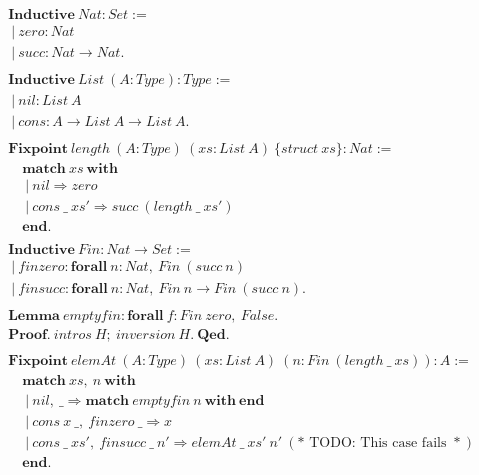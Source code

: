 \begin{align*}
&\mathbf{Inductive}\ Nat : Set :=\\
&\ |\ zero : Nat\\
&\ |\ succ : Nat \rightarrow Nat.\\
\\
&\mathbf{Inductive}\ List\ (A : Type) : Type :=\\
&\ |\ nil : List\ A\\
&\ |\ cons : A \rightarrow List\ A \rightarrow List\ A.\\
\\
&\mathbf{Fixpoint}\ length\ (A : Type)\ (xs : List\ A)\ \{struct\ xs\} : Nat :=\\
&\quad\mathbf{match}\ xs\ \mathbf{with}\\
&\quad\ |\ nil \Rightarrow zero\\
&\quad\ |\ cons\ \_\ xs' \Rightarrow succ\ (length\ \_\ xs')\\
&\quad\mathbf{end}.\\
\\
&\mathbf{Inductive}\ Fin : Nat \rightarrow Set :=\\
&\ |\ finzero : \mathbf{forall}\ n : Nat,\ Fin\ (succ\ n)\\
&\ |\ finsucc : \mathbf{forall}\ n : Nat,\ Fin\ n \rightarrow Fin\ (succ\ n).\\
\\
&\mathbf{Lemma}\ emptyfin : \mathbf{forall}\ f : Fin\ zero,\ False.\\
&\mathbf{Proof}.\ intros\ H;\ inversion\ H.\ \mathbf{Qed}.\\
\\
&\mathbf{Fixpoint}\ elemAt\ (A : Type)\ (xs : List\ A)\ (n : Fin\ (length\ \_\ xs)) : A :=\\
&\quad\mathbf{match}\ xs,\ n\ \mathbf{with}\\
&\quad\ |\ nil,\ \_ \Rightarrow \mathbf{match}\ emptyfin\ n\ \mathbf{with\ end}\\
&\quad\ |\ cons\ x\ \_,\ finzero\ \_ \Rightarrow x\\
&\quad\ |\ cons\ \_\ xs',\ finsucc\ \_\ n' \Rightarrow elemAt\ \_\ xs'\ n'
\ (*\text{ TODO: This case fails }*)\\
&\quad\mathbf{end}.
\end{align*}

